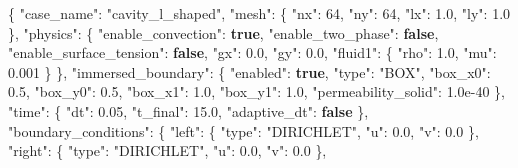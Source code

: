 \documentclass[
  french,
]{article}
\newenvironment{Shaded}{}{}
\newcommand{\DataTypeTok}[1]{\textcolor[rgb]{0.56,0.13,0.00}{#1}}
\newcommand{\DecValTok}[1]{\textcolor[rgb]{0.25,0.63,0.44}{#1}}
\newcommand{\FloatTok}[1]{\textcolor[rgb]{0.25,0.63,0.44}{#1}}
\newcommand{\FunctionTok}[1]{\textcolor[rgb]{0.02,0.16,0.49}{#1}}
\newcommand{\KeywordTok}[1]{\textcolor[rgb]{0.00,0.44,0.13}{\textbf{#1}}}
\newcommand{\StringTok}[1]{\textcolor[rgb]{0.25,0.44,0.63}{#1}}
\begin{document}
\begin{Shaded}
\begin{Highlighting}[]
\FunctionTok{\{}
  \DataTypeTok{"case\_name"}\FunctionTok{:} \StringTok{"cavity\_l\_shaped"}\FunctionTok{,}
  \DataTypeTok{"mesh"}\FunctionTok{:} \FunctionTok{\{} \DataTypeTok{"nx"}\FunctionTok{:} \DecValTok{64}\FunctionTok{,} \DataTypeTok{"ny"}\FunctionTok{:} \DecValTok{64}\FunctionTok{,} \DataTypeTok{"lx"}\FunctionTok{:} \FloatTok{1.0}\FunctionTok{,} \DataTypeTok{"ly"}\FunctionTok{:} \FloatTok{1.0} \FunctionTok{\},}
  \DataTypeTok{"physics"}\FunctionTok{:} \FunctionTok{\{}
    \DataTypeTok{"enable\_convection"}\FunctionTok{:} \KeywordTok{true}\FunctionTok{,}
    \DataTypeTok{"enable\_two\_phase"}\FunctionTok{:} \KeywordTok{false}\FunctionTok{,}
    \DataTypeTok{"enable\_surface\_tension"}\FunctionTok{:} \KeywordTok{false}\FunctionTok{,}
    \DataTypeTok{"gx"}\FunctionTok{:} \FloatTok{0.0}\FunctionTok{,} \DataTypeTok{"gy"}\FunctionTok{:} \FloatTok{0.0}\FunctionTok{,}
    \DataTypeTok{"fluid1"}\FunctionTok{:} \FunctionTok{\{} \DataTypeTok{"rho"}\FunctionTok{:} \FloatTok{1.0}\FunctionTok{,} \DataTypeTok{"mu"}\FunctionTok{:} \FloatTok{0.001} \FunctionTok{\}}
  \FunctionTok{\},}
  \DataTypeTok{"immersed\_boundary"}\FunctionTok{:} \FunctionTok{\{}
    \DataTypeTok{"enabled"}\FunctionTok{:} \KeywordTok{true}\FunctionTok{,}
    \DataTypeTok{"type"}\FunctionTok{:} \StringTok{"BOX"}\FunctionTok{,}
    \DataTypeTok{"box\_x0"}\FunctionTok{:} \FloatTok{0.5}\FunctionTok{,} \DataTypeTok{"box\_y0"}\FunctionTok{:} \FloatTok{0.5}\FunctionTok{,} \DataTypeTok{"box\_x1"}\FunctionTok{:} \FloatTok{1.0}\FunctionTok{,} \DataTypeTok{"box\_y1"}\FunctionTok{:} \FloatTok{1.0}\FunctionTok{,}
    \DataTypeTok{"permeability\_solid"}\FunctionTok{:} \FloatTok{1.0e{-}40}
  \FunctionTok{\},}
  \DataTypeTok{"time"}\FunctionTok{:} \FunctionTok{\{} \DataTypeTok{"dt"}\FunctionTok{:} \FloatTok{0.05}\FunctionTok{,} \DataTypeTok{"t\_final"}\FunctionTok{:} \FloatTok{15.0}\FunctionTok{,} \DataTypeTok{"adaptive\_dt"}\FunctionTok{:} \KeywordTok{false} \FunctionTok{\},}
  \DataTypeTok{"boundary\_conditions"}\FunctionTok{:} \FunctionTok{\{}
    \DataTypeTok{"left"}\FunctionTok{:}   \FunctionTok{\{} \DataTypeTok{"type"}\FunctionTok{:} \StringTok{"DIRICHLET"}\FunctionTok{,} \DataTypeTok{"u"}\FunctionTok{:} \FloatTok{0.0}\FunctionTok{,} \DataTypeTok{"v"}\FunctionTok{:} \FloatTok{0.0} \FunctionTok{\},}
    \DataTypeTok{"right"}\FunctionTok{:}  \FunctionTok{\{} \DataTypeTok{"type"}\FunctionTok{:} \StringTok{"DIRICHLET"}\FunctionTok{,} \DataTypeTok{"u"}\FunctionTok{:} \FloatTok{0.0}\FunctionTok{,} \DataTypeTok{"v"}\FunctionTok{:} \FloatTok{0.0} \FunctionTok{\},}

\end{Highlighting}
\end{Shaded}
\end{document}
